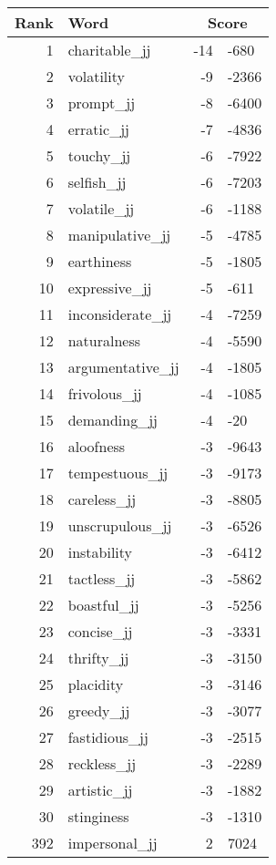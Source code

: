\begin{longtable}[!htbp]{| rlr@{.}l |}
    \hline
    \textbf{Rank} & \textbf{Word} & \multicolumn{2}{c|}{\textbf{Score}} \\
    \hline
    \endhead
    1 & charitable\_jj & -14 & -680 \\
    2 & volatility & -9 & -2366 \\
    3 & prompt\_jj & -8 & -6400 \\
    4 & erratic\_jj & -7 & -4836 \\
    5 & touchy\_jj & -6 & -7922 \\
    6 & selfish\_jj & -6 & -7203 \\
    7 & volatile\_jj & -6 & -1188 \\
    8 & manipulative\_jj & -5 & -4785 \\
    9 & earthiness & -5 & -1805 \\
    10 & expressive\_jj & -5 & -611 \\
    11 & inconsiderate\_jj & -4 & -7259 \\
    12 & naturalness & -4 & -5590 \\
    13 & argumentative\_jj & -4 & -1805 \\
    14 & frivolous\_jj & -4 & -1085 \\
    15 & demanding\_jj & -4 & -20 \\
    16 & aloofness & -3 & -9643 \\
    17 & tempestuous\_jj & -3 & -9173 \\
    18 & careless\_jj & -3 & -8805 \\
    19 & unscrupulous\_jj & -3 & -6526 \\
    20 & instability & -3 & -6412 \\
    21 & tactless\_jj & -3 & -5862 \\
    22 & boastful\_jj & -3 & -5256 \\
    23 & concise\_jj & -3 & -3331 \\
    24 & thrifty\_jj & -3 & -3150 \\
    25 & placidity & -3 & -3146 \\
    26 & greedy\_jj & -3 & -3077 \\
    27 & fastidious\_jj & -3 & -2515 \\
    28 & reckless\_jj & -3 & -2289 \\
    29 & artistic\_jj & -3 & -1882 \\
    30 & stinginess & -3 & -1310 \\
    392 & impersonal\_jj & 2 & 7024 \\

\end{longtable}
